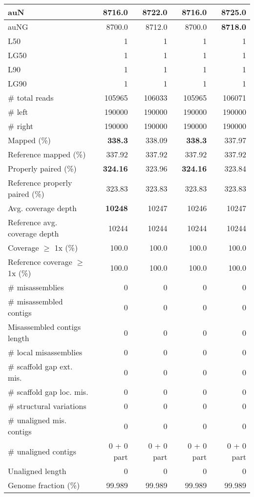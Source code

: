 \documentclass[12pt,a4paper]{article}
\begin{document}
\begin{table}[ht]
\begin{center}
\begin{tabular}{|l*{4}{|r}|}
auN & 8716.0 & 8722.0 & 8716.0 & {\bf 8725.0} \\ \hline
auNG & 8700.0 & 8712.0 & 8700.0 & {\bf 8718.0} \\ \hline
L50 & 1 & 1 & 1 & 1 \\ \hline
LG50 & 1 & 1 & 1 & 1 \\ \hline
L90 & 1 & 1 & 1 & 1 \\ \hline
LG90 & 1 & 1 & 1 & 1 \\ \hline
\# total reads & 105965 & 106033 & 105965 & 106071 \\ \hline
\# left & 190000 & 190000 & 190000 & 190000 \\ \hline
\# right & 190000 & 190000 & 190000 & 190000 \\ \hline
Mapped (\%) & {\bf 338.3} & 338.09 & {\bf 338.3} & 337.97 \\ \hline
Reference mapped (\%) & 337.92 & 337.92 & 337.92 & 337.92 \\ \hline
Properly paired (\%) & {\bf 324.16} & 323.96 & {\bf 324.16} & 323.84 \\ \hline
Reference properly paired (\%) & 323.83 & 323.83 & 323.83 & 323.83 \\ \hline
Avg. coverage depth & {\bf 10248} & 10247 & 10246 & 10247 \\ \hline
Reference avg. coverage depth & 10244 & 10244 & 10244 & 10244 \\ \hline
Coverage $\geq$ 1x (\%) & 100.0 & 100.0 & 100.0 & 100.0 \\ \hline
Reference coverage $\geq$ 1x (\%) & 100.0 & 100.0 & 100.0 & 100.0 \\ \hline
\# misassemblies & 0 & 0 & 0 & 0 \\ \hline
\# misassembled contigs & 0 & 0 & 0 & 0 \\ \hline
Misassembled contigs length & 0 & 0 & 0 & 0 \\ \hline
\# local misassemblies & 0 & 0 & 0 & 0 \\ \hline
\# scaffold gap ext. mis. & 0 & 0 & 0 & 0 \\ \hline
\# scaffold gap loc. mis. & 0 & 0 & 0 & 0 \\ \hline
\# structural variations & 0 & 0 & 0 & 0 \\ \hline
\# unaligned mis. contigs & 0 & 0 & 0 & 0 \\ \hline
\# unaligned contigs & 0 + 0 part & 0 + 0 part & 0 + 0 part & 0 + 0 part \\ \hline
Unaligned length & 0 & 0 & 0 & 0 \\ \hline
Genome fraction (\%) & 99.989 & 99.989 & 99.989 & 99.989 \\ \hline

\end{tabular}
\end{center}
\end{table}
\end{document}
